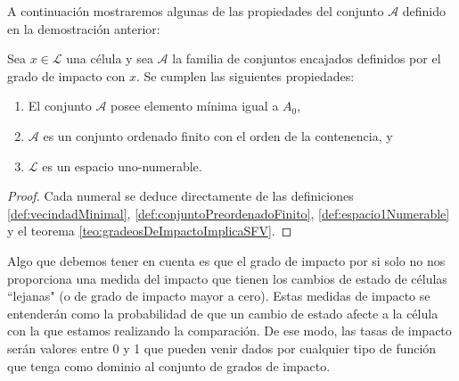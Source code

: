 A continuación mostraremos algunas de las propiedades del conjunto $\mathcal{A}$ definido en la demostración anterior:

\begin{proposicion}\label{pro:propiedadesSistemasDeVecindadesEncajadas}
Sea $x\in\mathcal{L}$ una célula y sea $\mathcal{A}$ la familia de conjuntos encajados definidos por el grado de impacto con $x$. Se cumplen las siguientes propiedades:
\begin{enumerate}
    \item El conjunto $\mathcal{A}$ posee elemento mínima igual a $A_0$,
    \item $\mathcal{A}$ es un conjunto ordenado finito con el orden de la contenencia, y
    \item $\mathcal{L}$ es un espacio uno-numerable.
\end{enumerate}
\end{proposicion}
\begin{proof}
Cada numeral se deduce directamente de las definiciones \ref{def:vecindadMinimal}, \ref{def:conjuntoPreordenadoFinito}, \ref{def:espacio1Numerable} y el teorema \ref{teo:gradeosDeImpactoImplicaSFV}.
\end{proof}

Algo que debemos tener en cuenta es que el grado de impacto por si solo no nos proporciona una medida del impacto que tienen los cambios de estado de células ``lejanas" (o de grado de impacto mayor a cero). Estas medidas de impacto se entenderán como la probabilidad de que un cambio de estado afecte a la célula con la que estamos realizando la comparación. De ese modo, las tasas de impacto serán valores entre 0 y 1 que pueden venir dados por cualquier tipo de función que tenga como dominio al conjunto de grados de impacto.

